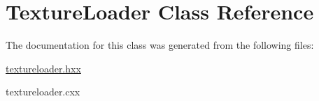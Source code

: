 \hypertarget{classTextureLoader}{\section{Texture\-Loader Class Reference}
\label{classTextureLoader}
}


The documentation for this class was generated from the following files\-:\begin{DoxyCompactItemize}
\item 
\hyperlink{textureloader_8hxx}{textureloader.\-hxx}\item 
textureloader.\-cxx\end{DoxyCompactItemize}
